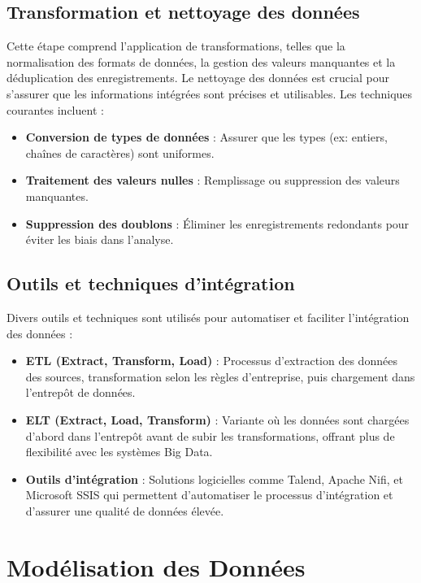 \documentclass[a4paper,12pt]{report}
\begin{document}
\section{Transformation et nettoyage des données}
Cette étape comprend l'application de transformations, telles que la normalisation des formats de données, la gestion des valeurs manquantes et la déduplication des enregistrements. Le nettoyage des données est crucial pour s'assurer que les informations intégrées sont précises et utilisables. Les techniques courantes incluent :
\begin{itemize}
    \item \textbf{Conversion de types de données} : Assurer que les types (ex: entiers, chaînes de caractères) sont uniformes.
    \item \textbf{Traitement des valeurs nulles} : Remplissage ou suppression des valeurs manquantes.
    \item \textbf{Suppression des doublons} : Éliminer les enregistrements redondants pour éviter les biais dans l'analyse.
\end{itemize}

\section{Outils et techniques d'intégration}
Divers outils et techniques sont utilisés pour automatiser et faciliter l'intégration des données :
\begin{itemize}
    \item \textbf{ETL (Extract, Transform, Load)} : Processus d'extraction des données des sources, transformation selon les règles d'entreprise, puis chargement dans l'entrepôt de données.
    \item \textbf{ELT (Extract, Load, Transform)} : Variante où les données sont chargées d'abord dans l'entrepôt avant de subir les transformations, offrant plus de flexibilité avec les systèmes Big Data.
    \item \textbf{Outils d'intégration} : Solutions logicielles comme Talend, Apache Nifi, et Microsoft SSIS qui permettent d'automatiser le processus d'intégration et d'assurer une qualité de données élevée.
\end{itemize}












\chapter{Modélisation des Données}
\end{document}
